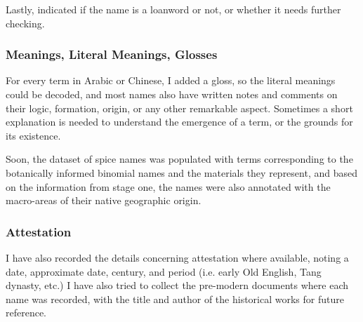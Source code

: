Lastly, indicated if the name is a loanword or not, or whether it needs further checking. %

\subsubsection{Meanings, Literal Meanings, Glosses}

For every term in Arabic or Chinese, I added a gloss, so the literal meanings could be decoded, and most names also have written notes and comments on their logic, formation, origin, or any other remarkable aspect. Sometimes a short explanation is needed to understand the emergence of a term, or the grounds for its existence. 

Soon, the dataset of spice names was populated with terms corresponding to the botanically informed binomial names and the materials they represent, and based on the information from stage one, the names were also annotated with the macro-areas of their native geographic origin.




\subsubsection{Attestation}

I have also recorded the details concerning attestation where available, noting a date, approximate date, century, and period (i.e. early Old English, Tang dynasty, etc.) I have 
also tried to collect the pre-modern documents where each name was recorded, with the title and author of the historical works for future reference. %




